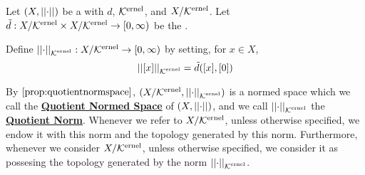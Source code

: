 \label{def:quotientnormspace}
\newcommand{\QuotientNorm}[0]{\textbf{\hyperref[def:quotientnormspace]{Quotient Norm}}\xspace}
\newcommand{\QuotientNormedSpace}[0]{\textbf{\hyperref[def:quotientnormspace]{Quotient Normed Space}}\xspace}

\begin{df}
Let $(X,\norm{\cdot})$ be a \SeminormedSpace
with \SeminormInducedPseudometric $d$, 
\SeminormKernel $\Ker$, and
\SeminormKernelQuotientVectorSpace $X/\Ker$.
Let $\tilde{d}:X/\Ker \times X/\Ker \to [0,\infty)$ be the \MetricInducedByPseudometric.

Define $\norm{\cdot}_{\Ker} : X/\Ker \to [0,\infty)$ by setting, 
for $x \in X$, 
\begin{equation}
\norm{[x]}_{\Ker} = \tilde{d}([x], [0])
\end{equation}

By $\ref{prop:quotientnormspace}$, $(X/\Ker, \norm{\cdot}_{\Ker})$ is a normed space which we call the \QuotientNormedSpace of $(X,\norm{\cdot})$, and we call $\norm{\cdot}_{\Ker}$ the \QuotientNorm. 
Whenever we refer to $X/\Ker$, unless otherwise specified, we endow it with this norm and the topology generated by this norm.
Furthermore, whenever we consider $X/\Ker$, unless otherwise specified, we consider it as 
possesing the topology generated by the norm $\norm{\cdot}_{\Ker}$. 
\end{df}
